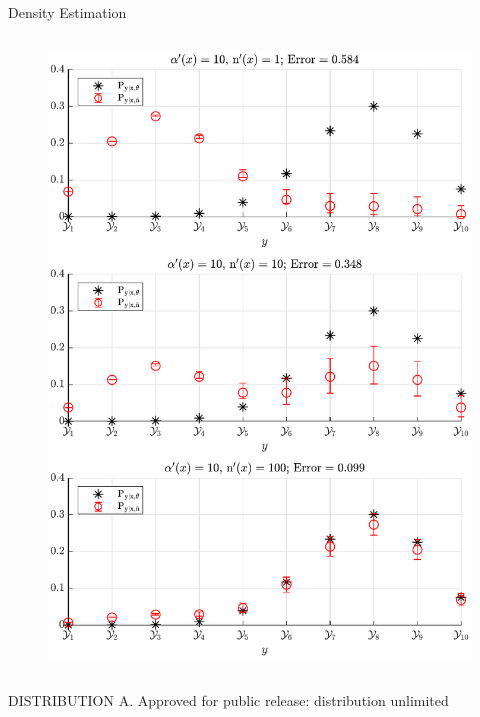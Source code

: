 \documentclass[xcolor=dvipsnames]{beamer}
\begin{document}
\begin{frame}{}
\begin{columns}[T]
\begin{column}{.34\linewidth}
\begin{block}{Density Estimation}
\begin{columns}[t]
\begin{column}{.5\linewidth}
\begin{figure}
\centering
\includegraphics[width=0.9\linewidth]{P_yx_error_a0_10.pdf}
\end{figure}

\end{column}
\end{columns}



\end{block}  
    
\end{column}



\end{columns}


\centering
\color{NRL_yellow}
\small
DISTRIBUTION A. Approved for public release: distribution unlimited





\end{frame}
\end{document}
